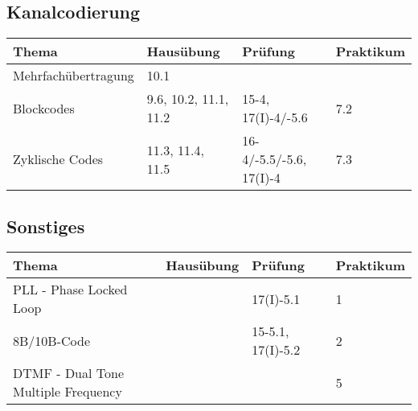 \subsection{Kanalcodierung}
	\begin{tabular}{|p{9cm}|p{2.5cm}|p{3.9cm}|p{1.6cm}|}
	\hline
	\textbf{Thema} & \textbf{Hausübung} & \textbf{Prüfung} & \textbf{Praktikum} \\ 
	\hline
	\hline
	Mehrfachübertragung & 10.1 & & \\
	\hline
	Blockcodes & 9.6, 10.2, 11.1, 11.2 & 15-4, 17(I)-4/-5.6 & 7.2\\
	\hline
	Zyklische Codes & 11.3, 11.4, 11.5 & 16-4/-5.5/-5.6, 17(I)-4& 7.3\\
	\hline
	\end{tabular}
\subsection{Sonstiges}
	\begin{tabular}{|p{9cm}|p{2.5cm}|p{3.9cm}|p{1.6cm}|}
	\hline  
	\textbf{Thema} & \textbf{Hausübung} & \textbf{Prüfung} & \textbf{Praktikum} \\ 
	\hline
	\hline
	PLL - Phase Locked Loop	& & 17(I)-5.1& 1 \\
	\hline
	8B/10B-Code & & 15-5.1, 17(I)-5.2 & 2 \\
	\hline
	DTMF - Dual Tone Multiple Frequency & & & 5\\
	\hline
	\end{tabular}
